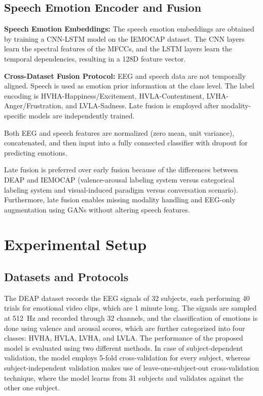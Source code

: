\documentclass[conference]{IEEEtran}
\begin{document}
\subsection{Speech Emotion Encoder and Fusion}

\textbf{Speech Emotion Embeddings:}
The speech emotion embeddings are obtained by training a CNN-LSTM model on the IEMOCAP dataset. The CNN layers learn the spectral features of the MFCCs, and the LSTM layers learn the temporal dependencies, resulting in a 128D feature vector.

\textbf{Cross-Dataset Fusion Protocol:}
EEG and speech data are not temporally aligned. Speech is used as emotion prior information at the class level. The label encoding is HVHA-Happiness/Excitement, HVLA-Contentment, LVHA-Anger/Frustration, and LVLA-Sadness. Late fusion is employed after modality-specific models are independently trained.

Both EEG and speech features are normalized (zero mean, unit variance), concatenated, and then input into a fully connected classifier with dropout for predicting emotions.

Late fusion is preferred over early fusion because of the differences between DEAP and IEMOCAP (valence-arousal labeling system versus categorical labeling system and visual-induced paradigm versus conversation scenario). Furthermore, late fusion enables missing modality handling and EEG-only augmentation using GANs without altering speech features.

\section{Experimental Setup}

\subsection{Datasets and Protocols}

The DEAP dataset records the EEG signals of 32 subjects, each performing 40 trials for emotional video clips, which are 1 minute long. The signals are sampled at 512~Hz and recorded through 32 channels, and the classification of emotions is done using valence and arousal scores, which are further categorized into four classes: HVHA, HVLA, LVHA, and LVLA.
The performance of the proposed model is evaluated using two different methods. In case of subject-dependent validation, the model employs 5-fold cross-validation for every subject, whereas subject-independent validation makes use of leave-one-subject-out cross-validation technique, where the model learns from 31 subjects and validates against the other one subject.
\end{document}
